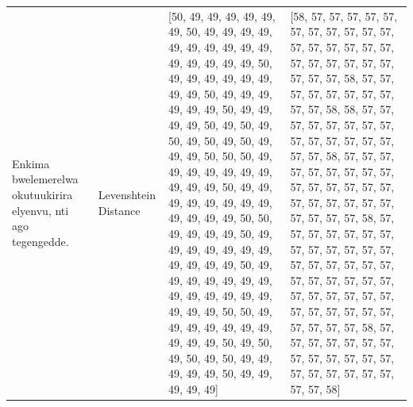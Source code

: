 \begin{tabular}{llll}
\multirow[t]{4}{*}{Enkima bwelemerelwa okutuukirira elyenvu, nti ago tegengedde.} & Levenshtein Distance & [50, 49, 49, 49, 49, 49, 49, 50, 49, 49, 49, 49, 49, 49, 49, 49, 49, 49, 49, 49, 49, 49, 49, 50, 49, 49, 49, 49, 49, 49, 49, 49, 50, 49, 49, 49, 49, 49, 49, 50, 49, 49, 49, 49, 50, 49, 50, 49, 50, 49, 50, 49, 50, 49, 49, 49, 50, 50, 50, 49, 49, 49, 49, 49, 49, 49, 49, 49, 49, 50, 49, 49, 49, 49, 49, 49, 49, 49, 49, 49, 49, 49, 50, 50, 49, 49, 49, 49, 50, 49, 49, 49, 49, 49, 49, 49, 49, 49, 49, 49, 50, 49, 49, 49, 49, 49, 49, 49, 49, 49, 49, 49, 49, 49, 49, 49, 49, 50, 50, 49, 49, 49, 49, 49, 49, 49, 49, 49, 49, 50, 49, 50, 49, 50, 49, 50, 49, 49, 49, 49, 49, 50, 49, 49, 49, 49, 49] & [58, 57, 57, 57, 57, 57, 57, 57, 57, 57, 57, 57, 57, 57, 57, 57, 57, 57, 57, 57, 57, 57, 57, 57, 57, 57, 57, 58, 57, 57, 57, 57, 57, 57, 57, 57, 57, 57, 58, 58, 57, 57, 57, 57, 57, 57, 57, 57, 57, 57, 57, 57, 57, 57, 57, 57, 58, 57, 57, 57, 57, 57, 57, 57, 57, 57, 57, 57, 57, 57, 57, 57, 57, 57, 57, 57, 57, 57, 57, 57, 57, 57, 58, 57, 57, 57, 57, 57, 57, 57, 57, 57, 57, 57, 57, 57, 57, 57, 57, 57, 57, 57, 57, 57, 57, 57, 57, 57, 57, 57, 57, 57, 57, 57, 57, 57, 57, 57, 57, 57, 57, 57, 57, 57, 58, 57, 57, 57, 57, 57, 57, 57, 57, 57, 57, 57, 57, 57, 57, 57, 57, 57, 57, 57, 57, 57, 58] \\

\end{tabular}
